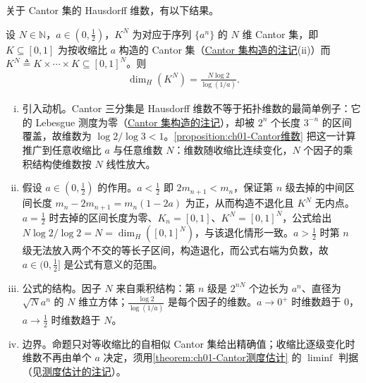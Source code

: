 \documentclass[../../main.tex]{subfiles}%
\begin{document}
关于 Cantor 集的 Hausdorff 维数，有以下结果。

\begin{proposition}\label{proposition:ch01-Cantor维数}
设 $N\in\mathbb{N}$，$a\in(0,\frac{1}{2})$，$K^N$ 为对应于序列 $\{a^n\}$ 的 $N$ 维 Cantor 集，即 $K\subseteq[0,1]$ 为按收缩比 $a$ 构造的 Cantor 集（\hyperref[remark:ch01-Cantor-Vitali]{Cantor 集构造的注记}(ii)）而 $K^N\triangleq K\times\cdots\times K\subseteq[0,1]^N$。则
\begin{align*}
\dim_H(K^N)=\frac{N\log2}{\log(1/a)} .
\end{align*}
\end{proposition}

\begin{remark}\label{remark:ch01-Cantor维数}
\begin{enumerate}[(i)]
\item 引入动机。Cantor 三分集是 Hausdorff 维数不等于拓扑维数的最简单例子：它的 Lebesgue 测度为零（\hyperref[remark:ch01-Cantor-Vitali]{Cantor 集构造的注记}），却被 $2^n$ 个长度 $3^{-n}$ 的区间覆盖，故维数为 $\log2/\log3<1$。\cref{proposition:ch01-Cantor维数} 把这一计算推广到任意收缩比 $a$ 与任意维数 $N$：维数随收缩比连续变化，$N$ 个因子的乘积结构使维数按 $N$ 线性放大。
\item 假设 $a\in(0,\frac12)$ 的作用。$a<\frac12$ 即 $2m_{n+1}<m_n$，保证第 $n$ 级去掉的中间区间长度 $m_n-2m_{n+1}=m_n(1-2a)$ 为正，从而构造不退化且 $K^N$ 无内点。$a=\frac12$ 时去掉的区间长度为零、$K_n=[0,1]$、$K^N=[0,1]^N$，公式给出 $N\log2/\log2=N=\dim_H([0,1]^N)$，与该退化情形一致。$a>\frac12$ 时第 $n$ 级无法放入两个不交的等长子区间，构造退化，而公式右端为负数，故 $a\in(0,\frac12]$ 是公式有意义的范围。
\item 公式的结构。因子 $N$ 来自乘积结构：第 $n$ 级是 $2^{nN}$ 个边长为 $a^n$、直径为 $\sqrt Na^n$ 的 $N$ 维立方体；$\frac{\log2}{\log(1/a)}$ 是每个因子的维数。$a\to0^+$ 时维数趋于 $0$，$a\to\frac12$ 时维数趋于 $N$。
\item 边界。命题只对等收缩比的自相似 Cantor 集给出精确值；收缩比逐级变化时维数不再由单个 $a$ 决定，须用\cref{theorem:ch01-Cantor测度估计} 的 $\liminf$ 判据（见\hyperref[remark:ch01-Cantor测度估计]{测度估计的注记}）。
\end{enumerate}
\end{remark}
\end{document}
